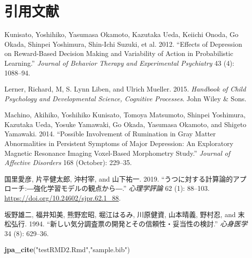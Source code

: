 \documentclass[11pt,a4paper,xelatex,ja=standard]{bxjsarticle}
\newenvironment{Shaded}{\begin{snugshade}}{\end{snugshade}}
\newcommand{\KeywordTok}[1]{\textcolor[rgb]{0.13,0.29,0.53}{\textbf{#1}}}
\newcommand{\NormalTok}[1]{#1}
\newcommand{\StringTok}[1]{\textcolor[rgb]{0.31,0.60,0.02}{#1}}
\newlength{\cslhangindent}
\newenvironment{cslreferences}%
  {\setlength{\parindent}{0pt}%
  \everypar{\setlength{\hangindent}{\cslhangindent}}\ignorespaces}%
  {\par}
\begin{document}
\hypertarget{ux5f15ux7528ux6587ux732e}{%
\section{引用文献}\label{ux5f15ux7528ux6587ux732e}}

\hypertarget{refs}{}
\begin{cslreferences}
\leavevmode\hypertarget{ref-Kunisato2012}{}%
Kunisato, Yoshihiko, Yasumasa Okamoto, Kazutaka Ueda, Keiichi Onoda, Go
Okada, Shinpei Yoshimura, Shin-Ichi Suzuki, et al. 2012. ``Effects of
Depression on Reward-Based Decision Making and Variability of Action in
Probabilistic Learning.'' \emph{Journal of Behavior Therapy and
Experimental Psychiatry} 43 (4): 1088--94.

\leavevmode\hypertarget{ref-lerner2015handbook}{}%
Lerner, Richard, M, S. Lynn Liben, and Ulrich Mueller. 2015.
\emph{Handbook of Child Psychology and Developmental Science, Cognitive
Processes}. John Wiley \& Sons.

\leavevmode\hypertarget{ref-Machino2014}{}%
Machino, Akihiko, Yoshihiko Kunisato, Tomoya Matsumoto, Shinpei
Yoshimura, Kazutaka Ueda, Yosuke Yamawaki, Go Okada, Yasumasa Okamoto,
and Shigeto Yamawaki. 2014. ``Possible Involvement of Rumination in Gray
Matter Abnormalities in Persistent Symptoms of Major Depression: An
Exploratory Magnetic Resonance Imaging Voxel-Based Morphometry Study.''
\emph{Journal of Affective Disorders} 168 (October): 229--35.

\leavevmode\hypertarget{ref-kunisato2019}{}%
国里愛彦, 片平健太郎, 沖村宰, and 山下祐一. 2019.
``うつに対する計算論的アプローチ:―強化学習モデルの観点から―.''
\emph{心理学評論} 62 (1): 88--103.
\url{https://doi.org/10.24602/sjpr.62.1_88}.

\leavevmode\hypertarget{ref-ux5742ux91ceux96c4ux4e8c1994}{}%
坂野雄二, 福井知美, 熊野宏昭, 堀江はるみ, 川原健資, 山本晴義, 野村忍,
and 末松弘行. 1994.
``新しい気分調査票の開発とその信頼性・妥当性の検討.'' \emph{心身医学} 34
(8): 629--36.
\end{cslreferences}

\begin{Shaded}
\begin{Highlighting}[]
\KeywordTok{jpa\_cite}\NormalTok{(}\StringTok{"testRMD2.Rmd"}\NormalTok{,}\StringTok{"sample.bib"}\NormalTok{)}
\end{Highlighting}
\end{Shaded}
\end{document}
